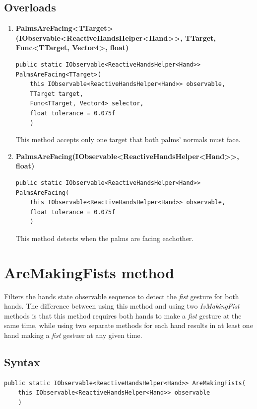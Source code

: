 \documentclass[12pt,a4paper,twoside]{report}
\begin{document}
\subsection{Overloads}
\begin{enumerate}
  \item \textbf{PalmsAreFacing<TTarget>(IObservable<ReactiveHandsHelper<Hand>{}>, TTarget, Func<TTarget, Vector4>, float)}
\begin{lstlisting}[caption=Declaration]
  public static IObservable<ReactiveHandsHelper<Hand>> PalmsAreFacing<TTarget>(
    this IObservable<ReactiveHandsHelper<Hand>> observable,
    TTarget target,
    Func<TTarget, Vector4> selector,
    float tolerance = 0.075f
    )
\end{lstlisting}
  This method accepts only one target that both palms' normals must face.

  \item \textbf{PalmsAreFacing(IObservable<ReactiveHandsHelper<Hand>{}>, float)}
\begin{lstlisting}[caption=Declaration]
  public static IObservable<ReactiveHandsHelper<Hand>> PalmsAreFacing(
    this IObservable<ReactiveHandsHelper<Hand>> observable,
    float tolerance = 0.075f
    )
\end{lstlisting}
  This method detects when the palms are facing eachother.

\end{enumerate}

\newpage

\section{AreMakingFists method}
Filters the hands state observable sequence to detect the \textit{fist} gesture for both hands. The difference between using this method and using two \textit{IsMakingFist} methods is that this method requires both hands to make a \textit{fist} gesture at the same time, while using two separate methods for each hand results in at least one hand making a \textit{fist} gestuer at any given time.

\subsection{Syntax}
\begin{lstlisting}[caption=Declaration]
  public static IObservable<ReactiveHandsHelper<Hand>> AreMakingFists(
    this IObservable<ReactiveHandsHelper<Hand>> observable
    )
\end{lstlisting}
\end{document}
